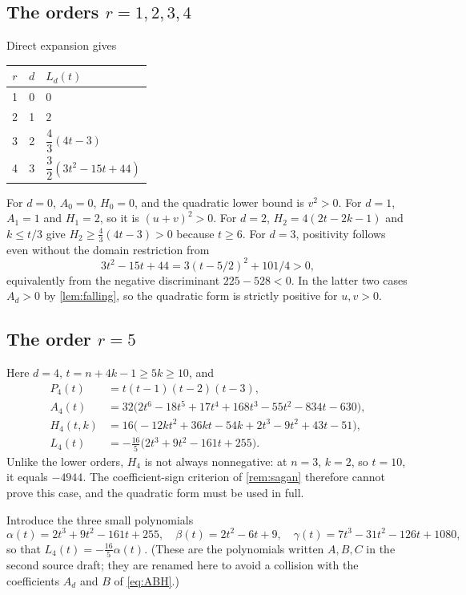 \documentclass[11pt,a4paper]{article}
\numberwithin{equation}{section}
\theoremstyle{definition}
\theoremstyle{remark}
\begin{document}
\subsection{The orders $r=1,2,3,4$}

Direct expansion gives
\begin{center}
\renewcommand{\arraystretch}{1.45}
\begin{tabular}{ccl}
\toprule
$r$ & $d$ & $L_d(t)$\\
\midrule
1 & 0 & $0$\\
2 & 1 & $2$\\
3 & 2 & $\dfrac43(4t-3)$\\
4 & 3 & $\dfrac32(3t^2-15t+44)$\\
\bottomrule
\end{tabular}
\end{center}
For $d=0$, $A_0=0$, $H_0=0$, and the quadratic lower bound is $v^2>0$.
For $d=1$, $A_1=1$ and $H_1=2$, so it is $(u+v)^2>0$.
For $d=2$, $H_2=4(2t-2k-1)$ and $k\le t/3$ give $H_2\ge\frac43(4t-3)>0$
because $t\ge6$.
For $d=3$, positivity follows even without the domain restriction from
\[
 3t^2-15t+44=3(t-5/2)^2+101/4>0,
\]
equivalently from the negative discriminant $225-528<0$.
In the latter two cases $A_d>0$ by \cref{lem:falling}, so the quadratic
form is strictly positive for $u,v>0$.

\subsection{The order $r=5$}

Here $d=4$, $t=n+4k-1\ge5k\ge10$, and
\begin{align}
 P_4(t)&=t(t-1)(t-2)(t-3),\label{eq:P4}\\
 A_4(t)&=32\bigl(2t^6-18t^5+17t^4+168t^3
                      -55t^2-834t-630\bigr),\label{eq:A4}\\
 H_4(t,k)&=16\bigl(-12kt^2+36kt-54k+2t^3-9t^2+43t-51\bigr),
                                                       \label{eq:H4}\\
 L_4(t)&=-\frac{16}{5}\bigl(2t^3+9t^2-161t+255\bigr).
                                                       \label{eq:L4}
\end{align}
Unlike the lower orders, $H_4$ is not always nonnegative: at $n=3$, $k=2$,
so $t=10$, it equals $-4944$. The coefficient-sign criterion of
\cref{rem:sagan} therefore cannot prove this case, and the quadratic form
must be used in full.

Introduce the three small polynomials
\begin{equation}\label{eq:abc}
 \alpha(t)=2t^3+9t^2-161t+255,\quad
 \beta(t)=2t^2-6t+9,\quad
 \gamma(t)=7t^3-31t^2-126t+1080,
\end{equation}
so that $L_4(t)=-\frac{16}{5}\alpha(t)$. (These are the polynomials written
$A,B,C$ in the second source draft; they are renamed here to avoid a
collision with the coefficients $A_d$ and $B$ of \eqref{eq:ABH}.)
\end{document}

